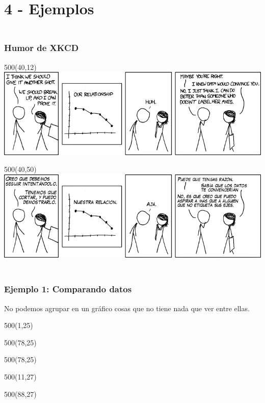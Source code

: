 \documentclass[aspectratio=169]{beamer}
\begin{document}
\section{4 - Ejemplos}

\begin{frame}[fragile]
    \frametitle{ \vspace{-1cm} \flushright \colorbox{verdeuca}{ \small \textcolor{white}{ \footnotesize \secname } }\\
    Humor de XKCD}
    \begin{textblock}{500}(40,12)  \includegraphics[scale=0.40]{img/convincing_en.png} \end{textblock}
    \begin{textblock}{500}(40,50) \includegraphics[scale=0.40]{img/convincing_es.png} \end{textblock}
\end{frame}

\begin{frame}[fragile,t]
    \frametitle{ \vspace{-1cm} \flushright \colorbox{verdeuca}{ \small \textcolor{white}{ \footnotesize \secname } }\\
    Ejemplo 1: Comparando datos}
    No podemos agrupar en un gráfico cosas que no tiene nada que ver entre ellas.
    \begin{textblock}{500}(1,25)   \end{textblock}
    \begin{textblock}{500}(78,25)  \end{textblock}
    \begin{textblock}{500}(78,25)  \end{textblock}
    \begin{textblock}{500}(11,27)    \end{textblock}
    \begin{textblock}{500}(88,27)  \end{textblock}
\end{frame}
\end{document}
